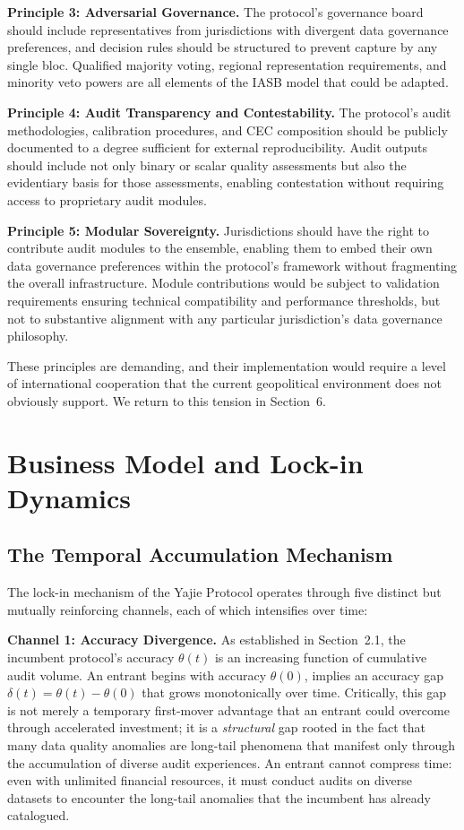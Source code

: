 \documentclass[12pt,a4paper]{article}
\theoremstyle{definition}
\theoremstyle{remark}
\begin{document}
\textbf{Principle 3: Adversarial Governance.} The protocol's governance board should include representatives from jurisdictions with divergent data governance preferences, and decision rules should be structured to prevent capture by any single bloc. Qualified majority voting, regional representation requirements, and minority veto powers are all elements of the IASB model that could be adapted.

\textbf{Principle 4: Audit Transparency and Contestability.} The protocol's audit methodologies, calibration procedures, and CEC composition should be publicly documented to a degree sufficient for external reproducibility. Audit outputs should include not only binary or scalar quality assessments but also the evidentiary basis for those assessments, enabling contestation without requiring access to proprietary audit modules.

\textbf{Principle 5: Modular Sovereignty.} Jurisdictions should have the right to contribute audit modules to the ensemble, enabling them to embed their own data governance preferences within the protocol's framework without fragmenting the overall infrastructure. Module contributions would be subject to validation requirements ensuring technical compatibility and performance thresholds, but not to substantive alignment with any particular jurisdiction's data governance philosophy.

These principles are demanding, and their implementation would require a level of international cooperation that the current geopolitical environment does not obviously support. We return to this tension in Section~6.

\section{Business Model and Lock-in Dynamics}

\subsection{The Temporal Accumulation Mechanism}

The lock-in mechanism of the Yajie Protocol operates through five distinct but mutually reinforcing channels, each of which intensifies over time:

\textbf{Channel 1: Accuracy Divergence.} As established in Section~2.1, the incumbent protocol's accuracy $\theta(t)$ is an increasing function of cumulative audit volume. An entrant begins with accuracy $\theta(0)$, implies an accuracy gap $\delta(t) = \theta(t) - \theta(0)$ that grows monotonically over time. Critically, this gap is not merely a temporary first-mover advantage that an entrant could overcome through accelerated investment; it is a \textit{structural} gap rooted in the fact that many data quality anomalies are long-tail phenomena that manifest only through the accumulation of diverse audit experiences. An entrant cannot compress time: even with unlimited financial resources, it must conduct audits on diverse datasets to encounter the long-tail anomalies that the incumbent has already catalogued.
\end{document}
